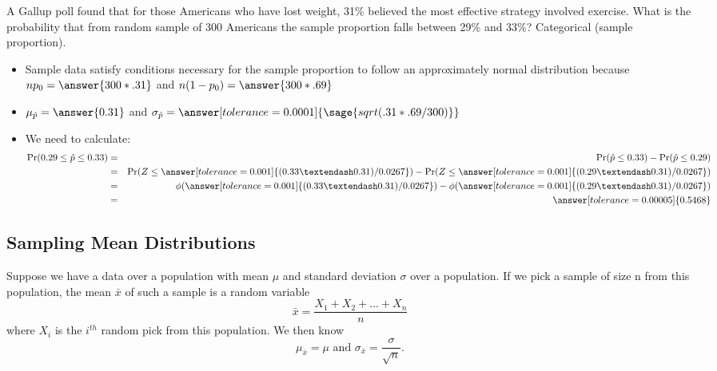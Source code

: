 \documentclass{ximera}
\begin{document}
\begin{problem}
A Gallup poll found that for those Americans who have lost weight, 31\% believed the most
effective strategy involved exercise. What is the probability that from random sample of 300
Americans the sample proportion falls between 29\% and 33\%? Categorical (sample proportion).  

\begin{explanation}
\begin{itemize} 
    \item Sample data  satisfy conditions necessary for the sample proportion to follow an
approximately normal distribution because $np_0=\answer{300*.31}$
and $n(1-p_0)=\answer{300*.69}$
    
    \item $\mu_{\hat p}=\answer{0.31}$ and $\sigma_{\hat p}=\answer[tolerance=0.0001]{\sage{sqrt(.31*.69/300)}}$

    \item We need to calculate:    
\begin{eqnarray*}
\Pr(0.29\leq \hat p \leq 0.33)
&=&
\Pr(\hat p \leq 0.33) -\Pr(\hat p \leq 0.29)
\\
&=&
\Pr(Z \leq \answer[tolerance=0.001]{(0.33 – 0.31)/0.0267 }) -\Pr(Z \leq \answer[tolerance=0.001]{(0.29 – 0.31)/0.0267 })
\\
&=& 
\phi(\answer[tolerance=0.001]{(0.33 – 0.31)/0.0267 })-\phi(\answer[tolerance=0.001]{(0.29 – 0.31)/0.0267 })
\\
&=&
\answer[tolerance=0.00005]{0.5468}
\end{eqnarray*}
\end{itemize}
\end{explanation}
\end{problem}

\subsection*{Sampling Mean Distributions}
Suppose we have a data over a population with mean $\mu$ and standard deviation $\sigma$ over a population. If we pick a sample of size n from this population, the mean $\bar x$ of such a sample is a random variable 
$$\bar{x}=\frac{X_1+X_2+\ldots+X_n}{n}$$
where $X_i$ is the $i^{th}$ random pick from this population. We then know
$$\mu_{\bar x}=\mu \mbox{ and } \sigma_{\bar x}=\frac{\sigma}{\sqrt{n}}.$$
\end{document}
